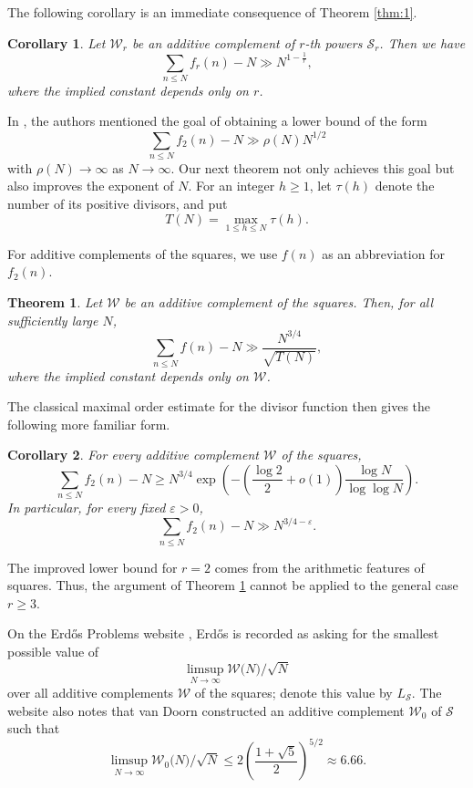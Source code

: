 \documentclass[12pt,a4paper,reqno]{amsart}
\numberwithin{equation}{section}
\theoremstyle{plain}
\newtheorem{theorem}{Theorem}
\newtheorem{corollary}{Corollary}
\theoremstyle{definition}
\begin{document}
The following corollary is an immediate consequence of Theorem \ref{thm:1}.

\begin{corollary}
   Let $\mathcal{W}_r$ be an additive complement of $r$-th powers $\mathcal{S}_r$. Then we have
$$
\sum_{n\le N}f_r(n)-N\gg N^{1-\frac{1}{r}},
$$
where the implied constant depends only on $r$.
\end{corollary}

In \cite{DSWX}, the authors mentioned the goal of obtaining a lower bound of the form 
$$
\sum_{n\le N}f_2(n)-N\gg \rho(N)N^{1/2}
$$ 
with $\rho(N)\rightarrow\infty$ as $N\rightarrow\infty$. Our next theorem not only achieves this goal but also improves the exponent of $N$. 
For an integer \(h\ge1\), let \(\tau(h)\) denote the number of its positive divisors, and put
\[
 T(N)=\max_{1\le h\le N}\tau(h).
\]

For additive complements of the squares, we use $f(n)$ as an abbreviation for $f_2(n)$. 

\begin{theorem}\label{thm:main}
Let \(\mathcal{W}\) be an additive complement of the squares.  Then, for all sufficiently large \(N\),
\[
 \sum_{n\le N}f(n)-N\gg \frac{N^{3/4}}{\sqrt{T(N)}},
\]
where the implied constant depends only on \(\mathcal{W}\).
\end{theorem}

The classical maximal order estimate for the divisor function then gives the following more familiar form.

\begin{corollary}\label{cor:wigert}
For every additive complement \(\mathcal{W}\) of the squares,
\[
 \sum_{n\le N}f_2(n)-N
 \ge N^{3/4}
 \exp\!\left(-\left(\frac{\log 2}{2}+o(1)\right)
       \frac{\log N}{\log\log N}\right).
\]
In particular, for every fixed \(\varepsilon>0\),
\[
 \sum_{n\le N}f_2(n)-N\gg N^{3/4-\varepsilon}.
\]
\end{corollary}
The improved lower bound for $r=2$ comes from the arithmetic features of squares. Thus, the argument of Theorem \ref{thm:main} cannot be applied to the general case $r\ge 3$.

On the Erd\H os Problems website \cite[Problem $\#$33]{Bloom}, Erd\H os is recorded as asking for the smallest possible value of
$$
\limsup_{N\rightarrow\infty}\mathcal{W}\big(N\big)/\sqrt{N}
$$
over all additive complements $\mathcal{W}$ of the squares; denote this value by $L_{\mathcal{S}}$. The website also notes that van Doorn constructed an additive complement $\mathcal{W}_0$ of $\mathcal{S}$ such that
$$
\limsup_{N\rightarrow\infty}\mathcal{W}_0\big(N\big)/\sqrt{N}\le 2\left(\frac{1+\sqrt{5}}{2}\right)^{5/2}\approx 6.66.
$$
\end{document}
